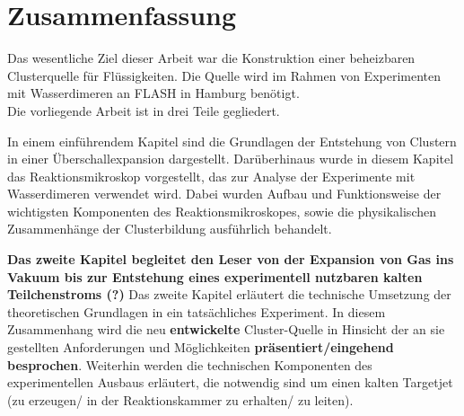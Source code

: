 \chapter{Zusammenfassung} 

Das wesentliche Ziel dieser Arbeit war die Konstruktion einer beheizbaren Clusterquelle für Flüssigkeiten. Die Quelle wird im Rahmen von Experimenten mit Wasserdimeren an FLASH in Hamburg benötigt. \\

Die vorliegende Arbeit ist in drei Teile gegliedert.

In einem einführendem Kapitel sind die Grundlagen der Entstehung von Clustern in einer Überschallexpansion dargestellt. Darüberhinaus wurde in diesem Kapitel das Reaktionsmikroskop vorgestellt, das zur Analyse der Experimente mit Wasserdimeren verwendet wird. Dabei wurden Aufbau und Funktionsweise der wichtigsten Komponenten des Reaktionsmikroskopes, sowie die physikalischen Zusammenhänge der Clusterbildung ausführlich behandelt.

\textbf{Das zweite Kapitel begleitet den Leser von der Expansion von Gas ins Vakuum bis zur Entstehung eines experimentell nutzbaren kalten Teilchenstroms (?)}
Das zweite Kapitel erläutert die technische Umsetzung der theoretischen Grundlagen in ein tatsächliches Experiment. In diesem Zusammenhang wird die neu \textbf{entwickelte} Cluster-Quelle in Hinsicht der an sie gestellten Anforderungen und Möglichkeiten \textbf{präsentiert/eingehend besprochen}. Weiterhin werden die technischen Komponenten des experimentellen Ausbaus erläutert, die notwendig sind um einen kalten Targetjet (zu erzeugen/ in der Reaktionskammer zu erhalten/ zu leiten).

